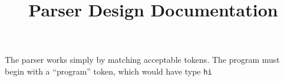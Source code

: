 \documentclass{article}
\title{Parser Design Documentation}
\begin{document}
\maketitle

The parser works simply by matching acceptable tokens. The program must begin with a ``program'' token, which would have type \texttt{hi}
\end{document}
